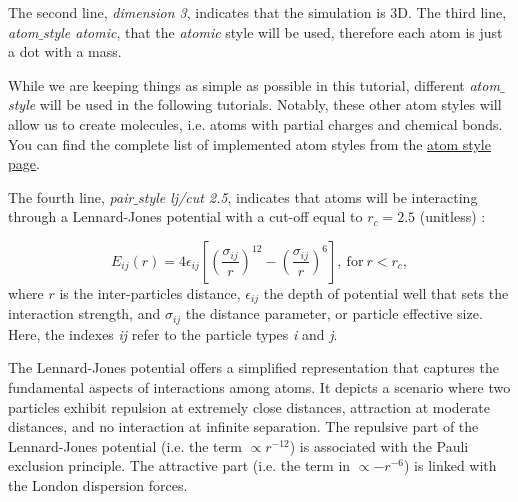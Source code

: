 \noindent The second line, \textit{dimension 3}, indicates that the simulation
is 3D. The third line, \textit{atom$\_$style atomic}, that the \textit{atomic} style
will be used, therefore each atom is just a dot with a mass.

\begin{tcolorbox}[colback=mylightblue!5!white,colframe=mylightblue!75!black,title=About the atom style]

\vspace{0.25cm} \noindent While we are keeping things as simple as possible in this tutorial,
different \textit{atom$\_$style} will be used in the following tutorials.
Notably, these other atom styles will allow us to create molecules,
i.e. atoms with partial charges and chemical bonds. You can find the complete list
of implemented atom styles from the \href{https://docs.lammps.org/atom_style.html}{atom style page}.
\end{tcolorbox}

\noindent The fourth line, \textit{pair$\_$style lj/cut 2.5}, indicates that atoms
will be interacting through a Lennard-Jones potential with
a cut-off equal to $r_c = 2.5$ (unitless)
\cite{wang2020lennard,fischer2023history}:

$$E_{ij} (r) = 4 \epsilon_{ij} \left[ \left( \dfrac{\sigma_{ij}}{r} \right)^{12} - \left( \dfrac{\sigma_{ij}}{r} \right)^{6} \right], ~ \text{for} ~ r < r_c,$$
where $r$ is the inter-particles distance,
$\epsilon_{ij}$ the depth of potential well that sets the interaction strength, and
$\sigma_{ij}$ the distance parameter, or particle effective size.
Here, the indexes \textit{ij} refer to the particle types \textit{i} and \textit{j}.

\begin{tcolorbox}[colback=mylightblue!5!white,colframe=mylightblue!75!black,title=About Lennard-Jones potential]

\vspace{0.25cm} \noindent The Lennard-Jones potential offers a simplified representation
that captures the fundamental
aspects of interactions among atoms. It depicts a scenario where two
particles exhibit repulsion at extremely close distances, attraction at moderate
distances, and no interaction at infinite separation. The repulsive part of the 
Lennard-Jones potential (i.e. the term $\propto r^{-12}$) is associated
with the Pauli exclusion principle. The attractive part (i.e. the term
in $\propto - r^{-6}$)
is linked with the London dispersion forces.
\end{tcolorbox}

